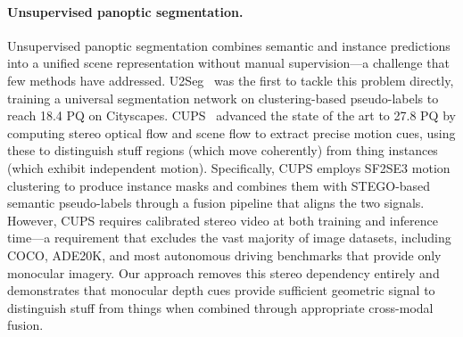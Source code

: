 \documentclass[10pt,twocolumn,letterpaper]{article}
\begin{document}
\paragraph{Unsupervised panoptic segmentation.}
Unsupervised panoptic segmentation combines semantic and instance predictions into a unified scene representation without manual supervision---a challenge that few methods have addressed. U2Seg~\cite{niu2024u2seg} was the first to tackle this problem directly, training a universal segmentation network on clustering-based pseudo-labels to reach 18.4 PQ on Cityscapes. CUPS~\cite{hahn2025cups} advanced the state of the art to 27.8 PQ by computing stereo optical flow and scene flow to extract precise motion cues, using these to distinguish stuff regions (which move coherently) from thing instances (which exhibit independent motion). Specifically, CUPS employs SF2SE3 motion clustering to produce instance masks and combines them with STEGO-based semantic pseudo-labels through a fusion pipeline that aligns the two signals. However, CUPS requires calibrated stereo video at both training and inference time---a requirement that excludes the vast majority of image datasets, including COCO, ADE20K, and most autonomous driving benchmarks that provide only monocular imagery. Our approach removes this stereo dependency entirely and demonstrates that monocular depth cues provide sufficient geometric signal to distinguish stuff from things when combined through appropriate cross-modal fusion.
\end{document}
